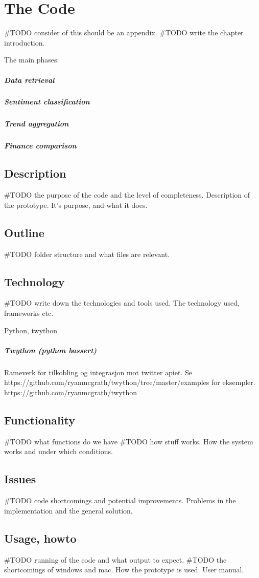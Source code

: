 \chapter{The Code}
#TODO consider of this should be an appendix.
#TODO write the chapter introduction. 

The main phases: 
\paragraph{Data retrieval}
\paragraph{Sentiment classification}
\paragraph{Trend aggregation}
\paragraph{Finance comparison}

\section{Description}
#TODO the purpose of the code and the level of completeness. 
Description of the prototype. It's purpose, and what it does. 

\section{Outline}
#TODO folder structure and what files are relevant. 

\section{Technology}
#TODO write down the technologies and tools used. 
The technology used, frameworks etc.

Python, twython

\paragraph{Twython (python bassert)}
Rameverk for tilkobling og integrasjon mot twitter apiet.
Se https://github.com/ryanmcgrath/twython/tree/master/examples for eksempler.
https://github.com/ryanmcgrath/twython

\section{Functionality}
#TODO what functions do we have
#TODO how stuff works. 
How the system works and under which conditions.

\section{Issues}
#TODO code shortcomings and potential improvements. 
Problems in the implementation and the general solution.

\section{Usage, howto}
#TODO running of the code and what output to expect. 
#TODO the shortcomings of windows and mac. 
How the prototype is used. User manual. 

